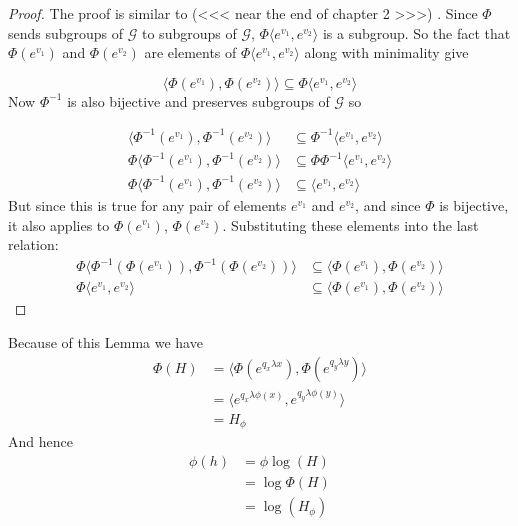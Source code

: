 \documentclass[honours]{UNSWthesis}
\newcommand{\G}{\mathcal{G}}
\newcommand{\1}{\mathbf{e}_{1}}
\newcommand{\2}{\mathbf{e}_{3}}
\newcommand{\3}{\mathbf{e}_{3}}
\begin{document}
\begin{proof}

The proof is similar to (<<< near the end of chapter 2 >>>) .
Since $\Phi$ sends subgroups of $\G$ to subgroups of $\G$, $\Phi \langle e^{v_{1}},e^{v_{2}} \rangle$ is a subgroup. So the fact that $\Phi(e^{v_{1}})$ and $\Phi(e^{v_{2}})$ are elements of $\Phi \langle e^{v_{1}},e^{v_{2}} \rangle$ along with minimality give

\[
\langle \Phi(e^{v_{1}}), \Phi(e^{v_{2}}) \rangle \subseteq \Phi \langle e^{v_{1}},e^{v_{2}} \rangle  
\]
Now $\Phi^{-1}$ is also bijective and preserves subgroups of $\G$ so

\begin{align*}
\langle \Phi^{-1}(e^{v_{1}}), \Phi^{-1}(e^{v_{2}}) \rangle &\subseteq \Phi^{-1} \langle e^{v_{1}},e^{v_{2}} \rangle  \\
\Phi \langle \Phi^{-1}(e^{v_{1}}), \Phi^{-1}(e^{v_{2}}) \rangle &\subseteq \Phi\Phi^{-1} \langle e^{v_{1}},e^{v_{2}} \rangle  \\
\Phi \langle \Phi^{-1}(e^{v_{1}}), \Phi^{-1}(e^{v_{2}}) \rangle &\subseteq  \langle e^{v_{1}},e^{v_{2}} \rangle  
\end{align*}
But since this is true for any pair of elements $e^{v_{1}}$ and $e^{v_{2}}$, and since $\Phi$ is bijective, it also applies to $\Phi(e^{v_{1}})$, $\Phi(e^{v_{2}})$. Substituting these elements into the last relation:
\begin{align*}
\Phi \langle \Phi^{-1}(\Phi(e^{v_{1}})), \Phi^{-1}(\Phi(e^{v_{2}})) \rangle &\subseteq  \langle \Phi(e^{v_{1}}),\Phi(e^{v_{2}}) \rangle \\
\Phi \langle e^{v_{1}}, e^{v_{2}} \rangle &\subseteq  \langle \Phi(e^{v_{1}}),\Phi(e^{v_{2}}) \rangle
\end{align*}

\end{proof}

Because of this Lemma we have 
\begin{align*}
\Phi(H) &=\langle \Phi(e^{q_{x}\lambda x}),\Phi(e^{q_{y}\lambda y}) \rangle \\
&= \langle e^{q_{x}\lambda \phi(x)},e^{q_{y}\lambda \phi(y)} \rangle \\
&= H_{\phi}
\end{align*}
And hence
\begin{align*}
\phi(h) &= \phi \log (H) \\
&=\log \Phi (H) \\
&= \log (H_{\phi})
\end{align*}
\end{document}
